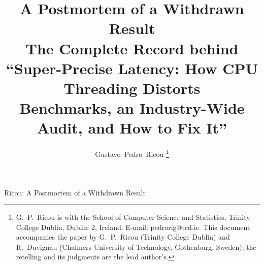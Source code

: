 \documentclass[10pt,journal,onecolumn]{IEEEtran}
\begin{document}
\title{A Postmortem of a Withdrawn Result\\
\large The Complete Record behind ``Super-Precise Latency: How CPU Threading Distorts\\
Benchmarks, an Industry-Wide Audit, and How to Fix It''}
\author{Gustavo~Pedro~Ricou%
\thanks{G.~P.~Ricou is with the School of Computer Science and Statistics, Trinity College
Dublin, Dublin~2, Ireland. E-mail: pedrorig@tcd.ie. This document accompanies the paper by
G.~P.~Ricou (Trinity College Dublin) and R.~Duvignau (Chalmers University of
Technology, Gothenburg, Sweden); the
retelling and its judgments are the lead author's.}}

%
{Ricou: A Postmortem of a Withdrawn Result}

\maketitle
\end{document}

